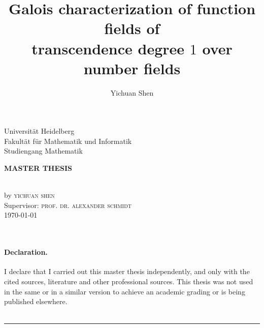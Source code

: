 \documentclass[11pt, a4paper, openany]{memoir}
\author{Yichuan Shen}
\title{Galois characterization of function fields of \\ transcendence degree $1$ over number fields}
\begin{document}
\theoremstyle{plain}
\theoremstyle{definition}
\newtheorem{theorem}{Theorem}[chapter]
\newtheorem{lemma}[theorem]{Lemma}
\newtheorem{proposition}[theorem]{Proposition}
\newtheorem{corollary}[theorem]{Corollary}
\theoremstyle{definition}
\newtheorem*{definition}{Definition}
\newtheorem*{example}{Example}
\theoremstyle{remark}
\newtheorem{remark}[theorem]{Remark}
\newtheorem{step}{Step}

\frontmatter
{}

\makeatletter
\begin{center}
\vspace*{0cm}
\begin{large}
Universität Heidelberg\\
Fakultät für Mathematik und Informatik\\
Studiengang Mathematik\\
\vspace{8mm}
\end{large}
\vfill
\begin{large}
\textbf{MASTER THESIS}\\
\end{large}
\vspace{10mm}
\linespread{2}\selectfont
\begin{huge}\@title \end{huge}\\
\linespread{1.1}\selectfont
\vspace{10mm}
by \textsc{yichuan shen}\\
\vspace{3cm}
\vfill
Supervisor: \textsc{prof. dr. alexander schmidt}\\
\today
\end{center}
\makeatother

\clearpage
\
\clearpage

\vspace*{0cm}
\vfill
\paragraph{Declaration.} I declare that I carried out this master thesis independently, and only with the cited sources, literature and other professional sources. This thesis was not used in the same or in a similar version to achieve an academic grading or is being published elsewhere.\\
\vspace{7mm}\\
\rule{7cm}{0.4pt}
\clearpage
\end{document}
